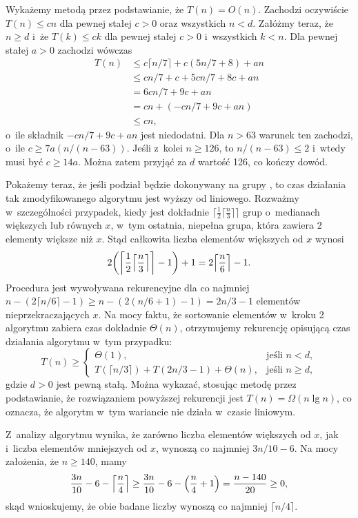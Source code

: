 Wykażemy metodą przez podstawianie, że $T(n)=O(n)$. Zachodzi oczywiście $T(n)\le cn$ dla pewnej stałej $c>0$ oraz wszystkich $n<d$. Załóżmy teraz, że $n\ge d$ i~że $T(k)\le ck$ dla pewnej stałej $c>0$ i~wszystkich $k<n$. Dla pewnej stałej $a>0$ zachodzi wówczas
\begin{align*}
	T(n) &\le c\lceil n/7\rceil+c(5n/7+8)+an \\
	&\le cn/7+c+5cn/7+8c+an \\
	&= 6cn/7+9c+an \\
	&= cn+(-cn/7+9c+an) \\
	&\le cn,
\end{align*}
o~ile składnik $-cn/7+9c+an$ jest niedodatni. Dla $n>63$ warunek ten zachodzi, o~ile $c\ge7a(n/(n-63))$. Jeśli z~kolei $n\ge126$, to $n/(n-63)\le2$ i~wtedy musi być $c\ge14a$. Można zatem przyjąć za $d$ wartość 126, co kończy dowód.

Pokażemy teraz, że jeśli podział będzie dokonywany na grupy , to czas działania tak zmodyfikowanego algorytmu  jest wyższy od liniowego. Rozważmy w~szczególności przypadek, kiedy jest dokładnie $\bigl\lceil\frac{1}{2}\bigl\lceil\frac{n}{3}\bigr\rceil\bigr\rceil$ grup o~medianach większych lub równych $x$, w~tym ostatnia, niepełna grupa, która zawiera 2 elementy większe niż $x$. Stąd całkowita liczba elementów większych od $x$ wynosi
\[
	2\biggl(\biggl\lceil\frac{1}{2}\Bigl\lceil\frac{n}{3}\Bigr\rceil\biggr\rceil-1\biggr)+1 = 2\Bigl\lceil\frac{n}{6}\Bigr\rceil-1.
\]
Procedura jest wywoływana rekurencyjne dla co najmniej $n-(2\lceil n/6\rceil-1)\ge n-(2(n/6+1)-1)=2n/3-1$ elementów nieprzekraczających $x$. Na mocy faktu, że sortowanie elementów w~kroku 2 algorytmu  zabiera czas dokładnie $\Theta(n)$, otrzymujemy rekurencję opisującą czas działania algorytmu w~tym przypadku:
\[
	T(n) \ge \begin{cases}
		\Theta(1), & \text{jeśli $n<d$}, \\
		T(\lceil n/3\rceil)+T(2n/3-1)+\Theta(n), & \text{jeśli $n\ge d$},
	\end{cases}
\]
gdzie $d>0$ jest pewną stałą. Można wykazać, stosując metodę przez podstawianie, że rozwiązaniem powyższej rekurencji jest $T(n)=\Omega(n\lg n)$, co oznacza, że algorytm w~tym wariancie nie działa w~czasie liniowym.

\exercise %
Z~analizy algorytmu  wynika, że zarówno liczba elementów większych od $x$, jak i~liczba elementów mniejszych od $x$, wynoszą co najmniej $3n/10-6$. Na mocy założenia, że $n\ge140$, mamy
\[
	\frac{3n}{10}-6-\Bigl\lceil\frac{n}{4}\Bigr\rceil \ge \frac{3n}{10}-6-\Bigl(\frac{n}{4}+1\Bigr) = \frac{n-140}{20} \ge 0,
\]
skąd wnioskujemy, że obie badane liczby wynoszą co najmniej $\lceil n/4\rceil$.

